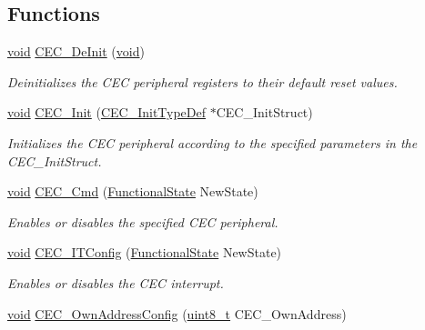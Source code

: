 \subsection*{Functions}
\begin{DoxyCompactItemize}
\item 
\hyperlink{usb__devapi_8h_afabf60e7f57651d6d595a02c75f07cd0}{void} \hyperlink{group___c_e_c___private___functions_ga604c3b15b51a46303c201fa3deac2212}{C\+E\+C\+\_\+\+De\+Init} (\hyperlink{usb__devapi_8h_afabf60e7f57651d6d595a02c75f07cd0}{void})
\begin{DoxyCompactList}\small\item\em Deinitializes the C\+EC peripheral registers to their default reset values. \end{DoxyCompactList}\item 
\hyperlink{usb__devapi_8h_afabf60e7f57651d6d595a02c75f07cd0}{void} \hyperlink{group___c_e_c___private___functions_gaf48aee745a16370372b3eaa7cf3ed22b}{C\+E\+C\+\_\+\+Init} (\hyperlink{struct_c_e_c___init_type_def}{C\+E\+C\+\_\+\+Init\+Type\+Def} $\ast$C\+E\+C\+\_\+\+Init\+Struct)
\begin{DoxyCompactList}\small\item\em Initializes the C\+EC peripheral according to the specified parameters in the C\+E\+C\+\_\+\+Init\+Struct. \end{DoxyCompactList}\item 
\hyperlink{usb__devapi_8h_afabf60e7f57651d6d595a02c75f07cd0}{void} \hyperlink{group___c_e_c___private___functions_ga0c8efa79e5768930e567b3b3ed6e09e9}{C\+E\+C\+\_\+\+Cmd} (\hyperlink{agilefox_2library_2inc_2stm32f10x__type_8h_ac9a7e9a35d2513ec15c3b537aaa4fba1}{Functional\+State} New\+State)
\begin{DoxyCompactList}\small\item\em Enables or disables the specified C\+EC peripheral. \end{DoxyCompactList}\item 
\hyperlink{usb__devapi_8h_afabf60e7f57651d6d595a02c75f07cd0}{void} \hyperlink{group___c_e_c___private___functions_ga8be87c514505cf82eb29334f054fc0bc}{C\+E\+C\+\_\+\+I\+T\+Config} (\hyperlink{agilefox_2library_2inc_2stm32f10x__type_8h_ac9a7e9a35d2513ec15c3b537aaa4fba1}{Functional\+State} New\+State)
\begin{DoxyCompactList}\small\item\em Enables or disables the C\+EC interrupt. \end{DoxyCompactList}\item 
\hyperlink{usb__devapi_8h_afabf60e7f57651d6d595a02c75f07cd0}{void} \hyperlink{group___c_e_c___private___functions_gacad422ef1f50246b2021b41835b8a95c}{C\+E\+C\+\_\+\+Own\+Address\+Config} (\hyperlink{_p_e___types_8h_aba7bc1797add20fe3efdf37ced1182c5}{uint8\+\_\+t} C\+E\+C\+\_\+\+Own\+Address)

\end{DoxyCompactItemize}
